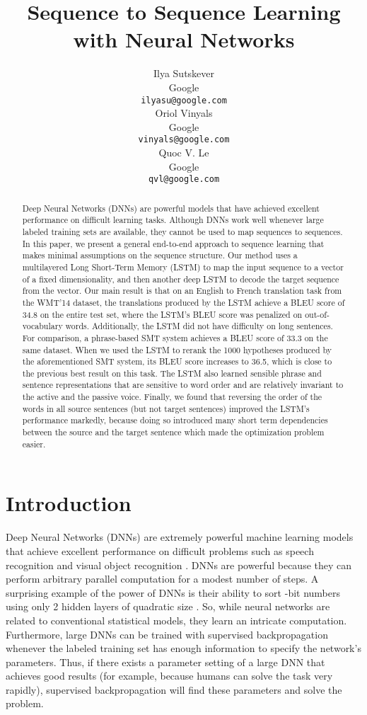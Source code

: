 \documentclass{article} \usepackage{nips14submit_e}
\title{Sequence to Sequence Learning\\with Neural Networks}
\author{
Ilya Sutskever \\
Google\\
\texttt{ilyasu@google.com} \\
\And
Oriol Vinyals \\
Google\\
\texttt{vinyals@google.com} \\
\And
Quoc V. Le \\
Google\\
\texttt{qvl@google.com} \\
}
\begin{document}
\maketitle

\begin{abstract}

Deep Neural Networks (DNNs) are powerful models that have achieved
excellent performance on difficult learning tasks. Although DNNs work
well whenever large labeled training sets are available, 
they cannot be used to map sequences to sequences.  In this paper, we
present a general end-to-end approach to sequence learning that makes
minimal assumptions on the sequence structure. Our method uses a
multilayered Long Short-Term Memory (LSTM) to map the input sequence
to a vector of a fixed dimensionality, and then another deep LSTM to
decode the target sequence from the vector.  Our main result is that
on an English to French translation task from the WMT'14 dataset, the
translations produced by the LSTM achieve a BLEU score of 34.8 on the
entire test set, where the LSTM's BLEU score was penalized on
out-of-vocabulary words. Additionally, the LSTM did not have
difficulty on long sentences. For comparison, a phrase-based
SMT system achieves a BLEU score of 33.3 on the same dataset.  When we
used the LSTM to rerank the 1000 hypotheses produced by the
aforementioned SMT system, its BLEU score increases to 36.5, which
is close to the previous best result on this task.  The LSTM also learned sensible
phrase and sentence representations that are sensitive to word order
and are relatively invariant to the active and the passive voice.
Finally, we found that reversing the order of the words in all source
sentences (but not target sentences) improved the LSTM's performance
markedly, because doing so introduced many short term dependencies
between the source and the target sentence which made the optimization
problem easier.

\end{abstract}
 
\section{Introduction}

Deep Neural Networks (DNNs) are extremely powerful machine learning
models that achieve excellent performance on difficult problems such
as speech recognition \cite{hinton12,dahl12b} and visual object
recognition \cite{kriz12,ciresan12,lecun98,le12}.  DNNs are
powerful because they can perform arbitrary parallel computation for a
modest number of steps.  A surprising example of the power of DNNs is
their ability to sort  \!\!\!\!\quad -bit numbers using only 2
hidden layers of quadratic size \cite{razborov}. So, while neural
networks are related to conventional statistical models, they learn an
intricate computation.  Furthermore, large DNNs can be trained with
supervised backpropagation whenever the labeled training set has
enough information to specify the network's parameters.  Thus, if
there exists a parameter setting of a large DNN that achieves good
results (for example, because humans can solve the task very rapidly),
supervised backpropagation will find these parameters and solve the
problem.
\end{document}
